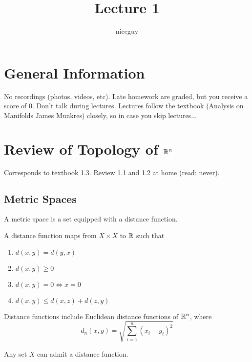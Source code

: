 \documentclass[12pt]{article}
\title{Lecture 1}
\author{niceguy}
\begin{document}
\maketitle

\section{General Information}

No recordings (photos, videos, etc). Late homework are graded, but you receive a score of 0. Don't talk during lectures. Lectures follow the textbook (Analysis on Manifolds James Munkres) closely, so in case you skip lectures...

\section{Review of Topology of $\mathbb{R}^n$}

Corresponds to textbook 1.3. Review 1.1 and 1.2 at home (read: never).

\subsection{Metric Spaces}

\begin{defn}
    A metric space is a set equipped with a distance function.
\end{defn}

\begin{defn}
    A distance function maps from $X \times X$ to $\mathbb{R}$ such that
    \begin{enumerate}
        \item $d(x,y) = d(y,x)$
        \item $d(x,y) \geq 0$
        \item $d(x,y) = 0 \Leftrightarrow x = 0$
        \item $d(x,y) \leq d(x,z) + d(z,y)$
    \end{enumerate}
\end{defn}

\begin{ex}
    Distance functions include Euclidean distance functions of $\mathbb{R}^n$, where
    \begin{equation}
        d_n(x,y) = \sqrt{\sum_{i=1}^n (x_i - y_i)^2}
    \end{equation}
\end{ex}

\begin{rem}
    Any set $X$ can admit a distance function.
\end{rem}
\end{document}
